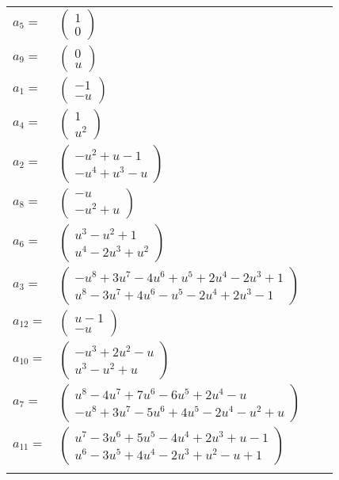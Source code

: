 \documentclass[1p]{elsarticle_modified}
\theoremstyle{definition}
\begin{document}
\begin{tabular}{m{7pt} m{180pt} m{7pt} m{180pt} }
\flushright $a_{5}=$&$\begin{pmatrix}1\\0\end{pmatrix}$ \\
\flushright $a_{9}=$&$\begin{pmatrix}0\\u\end{pmatrix}$ \\
\flushright $a_{1}=$&$\begin{pmatrix}-1\\- u\end{pmatrix}$ \\
\flushright $a_{4}=$&$\begin{pmatrix}1\\u^2\end{pmatrix}$ \\
\flushright $a_{2}=$&$\begin{pmatrix}- u^2+u-1\\- u^4+u^3- u\end{pmatrix}$ \\
\flushright $a_{8}=$&$\begin{pmatrix}- u\\- u^2+u\end{pmatrix}$ \\
\flushright $a_{6}=$&$\begin{pmatrix}u^3- u^2+1\\u^4-2 u^3+u^2\end{pmatrix}$ \\
\flushright $a_{3}=$&$\begin{pmatrix}- u^8+3 u^7-4 u^6+u^5+2 u^4-2 u^3+1\\u^8-3 u^7+4 u^6- u^5-2 u^4+2 u^3-1\end{pmatrix}$ \\
\flushright $a_{12}=$&$\begin{pmatrix}u-1\\- u\end{pmatrix}$ \\
\flushright $a_{10}=$&$\begin{pmatrix}- u^3+2 u^2- u\\u^3- u^2+u\end{pmatrix}$ \\
\flushright $a_{7}=$&$\begin{pmatrix}u^8-4 u^7+7 u^6-6 u^5+2 u^4- u\\- u^8+3 u^7-5 u^6+4 u^5-2 u^4- u^2+u\end{pmatrix}$ \\
\flushright $a_{11}=$&$\begin{pmatrix}u^7-3 u^6+5 u^5-4 u^4+2 u^3+u-1\\u^6-3 u^5+4 u^4-2 u^3+u^2- u+1\end{pmatrix}$\\&\end{tabular}
\end{document}
